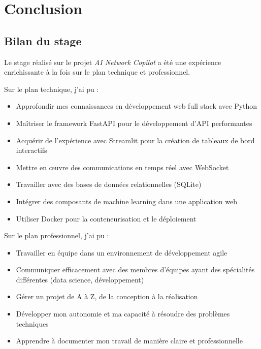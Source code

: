 \documentclass[12pt,a4paper]{report}
\begin{document}
\chapter{Conclusion}
\section{Bilan du stage}
Le stage réalisé sur le projet \textit{AI Network Copilot} a été une expérience enrichissante à la fois sur le plan technique et professionnel.

Sur le plan technique, j'ai pu :
\begin{itemize}
    \item Approfondir mes connaissances en développement web full stack avec Python
    \item Maîtriser le framework FastAPI pour le développement d'API performantes
    \item Acquérir de l'expérience avec Streamlit pour la création de tableaux de bord interactifs
    \item Mettre en œuvre des communications en temps réel avec WebSocket
    \item Travailler avec des bases de données relationnelles (SQLite)
    \item Intégrer des composants de machine learning dans une application web
    \item Utiliser Docker pour la conteneurisation et le déploiement
\end{itemize}

Sur le plan professionnel, j'ai pu :
\begin{itemize}
    \item Travailler en équipe dans un environnement de développement agile
    \item Communiquer efficacement avec des membres d'équipes ayant des spécialités différentes (data science, développement)
    \item Gérer un projet de A à Z, de la conception à la réalisation
    \item Développer mon autonomie et ma capacité à résoudre des problèmes techniques
    \item Apprendre à documenter mon travail de manière claire et professionnelle
\end{itemize}
\end{document}
